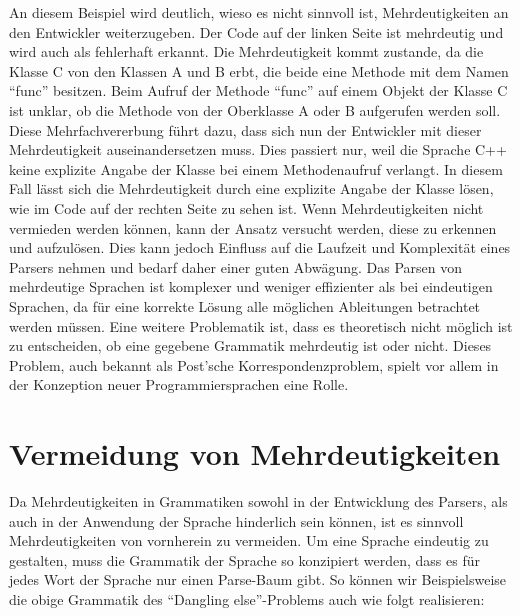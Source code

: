 \documentclass[runningheads]{llncs}
\begin{document}
    An diesem Beispiel wird deutlich,
    wieso es nicht sinnvoll ist, Mehrdeutigkeiten an den Entwickler weiterzugeben.
    Der Code auf der linken Seite ist mehrdeutig und wird auch als fehlerhaft erkannt.
    Die Mehrdeutigkeit kommt zustande, da die Klasse C von den Klassen A und B erbt,
    die beide eine Methode mit dem Namen ``func'' besitzen.
    Beim Aufruf der Methode ``func'' auf einem Objekt der Klasse C ist unklar,
    ob die Methode von der Oberklasse A oder B aufgerufen werden soll.
    Diese Mehrfachvererbung führt dazu, dass sich nun der Entwickler mit dieser Mehrdeutigkeit auseinandersetzen muss.
    Dies passiert nur, weil die Sprache C++ keine explizite Angabe der Klasse bei einem Methodenaufruf verlangt.
    In diesem Fall lässt sich die Mehrdeutigkeit durch eine explizite Angabe der Klasse lösen,
    wie im Code auf der rechten Seite zu sehen ist.
    Wenn Mehrdeutigkeiten nicht vermieden werden können,
    kann der Ansatz versucht werden, diese zu erkennen und aufzulösen.
    Dies kann jedoch Einfluss auf die Laufzeit und Komplexität eines Parsers nehmen und bedarf daher einer guten Abwägung.
    Das Parsen von mehrdeutige Sprachen ist komplexer und weniger effizienter als bei eindeutigen Sprachen,
    da für eine korrekte Lösung alle möglichen Ableitungen betrachtet werden müssen\cite{wharton1976resolution}.
    Eine weitere Problematik ist, dass es theoretisch nicht möglich ist zu entscheiden,
    ob eine gegebene Grammatik mehrdeutig ist oder nicht\cite{vasudevan2013detecting}.
    Dieses Problem, auch bekannt als Post'sche Korrespondenzproblem,
    spielt vor allem in der Konzeption neuer Programmiersprachen eine Rolle\cite{hans2014postsche}.


    \section{Vermeidung von Mehrdeutigkeiten}\label{sec:vermeidung-von-mehrdeutigkeiten}

    Da Mehrdeutigkeiten in Grammatiken sowohl in der Entwicklung des Parsers,
    als auch in der Anwendung der Sprache hinderlich sein können,
    ist es sinnvoll Mehrdeutigkeiten von vornherein zu vermeiden.
    Um eine Sprache eindeutig zu gestalten,
    muss die Grammatik der Sprache so konzipiert werden,
    dass es für jedes Wort der Sprache nur einen Parse-Baum gibt.
    So können wir Beispielsweise die obige Grammatik des ``Dangling else''-Problems auch wie folgt realisieren:
\end{document}
